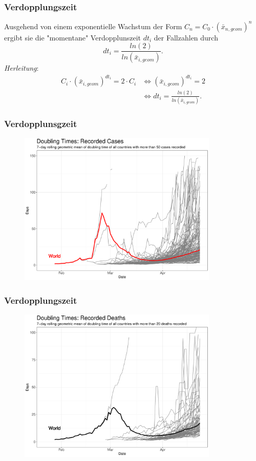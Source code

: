 \documentclass{beamer}
\begin{document}
\begin{frame}
\frametitle{Verdopplungszeit}
	Ausgehend von einem exponentielle Wachstum der Form $C_n = C_0 \cdot (\bar{x}_{n, geom})^{n}$ ergibt sie die "momentane" Verdopplunszeit $dt_i$ der Fallzahlen durch $$dt_i = \frac{ln(2)}{ln(\bar{x}_{i, geom})}.$$
	\pause
	\emph{Herleitung}: 
	\begin{align*} C_i \cdot (\bar{x}_{i, geom})^{dt_i} = 2 \cdot C_i 
	 &\iff (\bar{x}_{i, geom})^{dt_i} = 2 \\
	 &\iff dt_i = \frac{ln(2)}{ln(\bar{x}_{i, geom})}.
	\end{align*}
\end{frame}

\begin{frame}
\frametitle{Verdopplunsgzeit}
	\begin{figure}
		\centering
		\includegraphics[width = 270pt]{DT_confirmed}
	\end{figure}
\end{frame}

\begin{frame}
\frametitle{Verdopplungszeit}
	\begin{figure}
		\centering
		\includegraphics[width = 270pt]{DT_deaths}
	\end{figure}
\end{frame}
\end{document}
